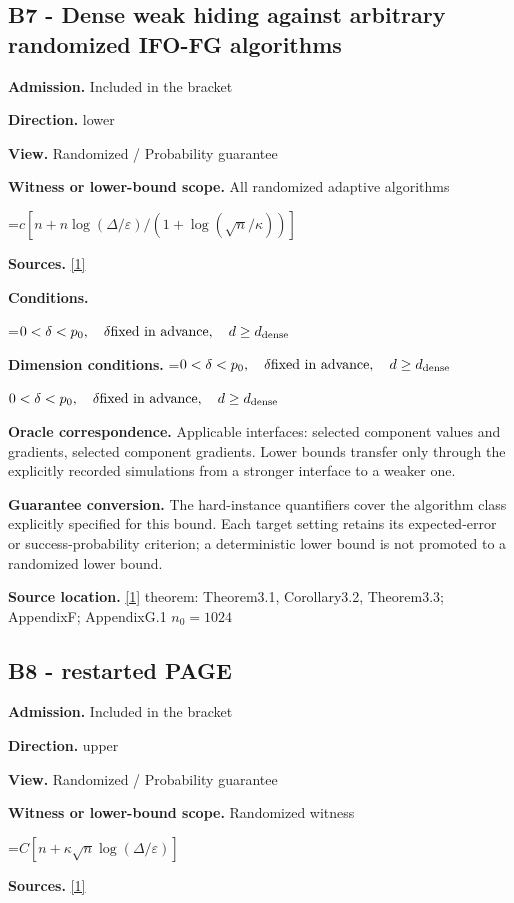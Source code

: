 \documentclass[10pt,a4paper]{article}
\newcommand{\AtlasMath}[1]{\par\begingroup\centering\setbox0=\hbox{$\displaystyle #1$}\ifdim\wd0>1.4\linewidth\typeout{ATLAS WIDE FORMULA: \the\wd0}\fi\ifdim\wd0>\linewidth\resizebox{\linewidth}{!}{\box0}\else\box0\fi\par\endgroup}
\newcommand{\AtlasInlineMath}[1]{\begingroup\setbox0=\hbox{$#1$}\ifdim\wd0>.4\linewidth\endgroup\AtlasMath{#1}\else\endgroup$#1$\fi}
\begin{document}
\subsection{B7 - Dense weak hiding against arbitrary randomized IFO-FG algorithms}
\textbf{Admission.} Included in the bracket

\textbf{Direction.} lower

\textbf{View.} Randomized / Probability guarantee

\textbf{Witness or lower-bound scope.} All randomized adaptive algorithms

\AtlasMath{c[n+n\log(\Delta/\varepsilon)/(1+\log(\sqrt n/\kappa))]}
\textbf{Sources.} \href{https://arxiv.org/pdf/2609.00045v3}{[1]}

\textbf{Conditions.} 
\AtlasMath{0<\delta<p_0,\quad\delta\text{fixed in advance},\quad d\ge d_{\rm dense}}


\textbf{Dimension conditions.} \AtlasInlineMath{0<\delta<p_0,\quad\delta\text{fixed in advance},\quad d\ge d_{\rm dense}}

\textbf{Oracle correspondence.} Applicable interfaces: selected component values and gradients, selected component gradients. Lower bounds transfer only through the explicitly recorded simulations from a stronger interface to a weaker one.

\textbf{Guarantee conversion.} The hard-instance quantifiers cover the algorithm class explicitly specified for this bound. Each target setting retains its expected-error or success-probability criterion; a deterministic lower bound is not promoted to a randomized lower bound.

\textbf{Source location.} \href{https://arxiv.org/pdf/2609.00045v3}{[1]} theorem: Theorem3.1, Corollary3.2, Theorem3.3; AppendixF; AppendixG.1 $n_0=1024$

\subsection{B8 - restarted PAGE}
\textbf{Admission.} Included in the bracket

\textbf{Direction.} upper

\textbf{View.} Randomized / Probability guarantee

\textbf{Witness or lower-bound scope.} Randomized witness

\AtlasMath{C[n+\kappa\sqrt n\log(\Delta/\varepsilon)]}
\textbf{Sources.} \href{https://arxiv.org/pdf/2609.00045v3}{[1]}
\end{document}
